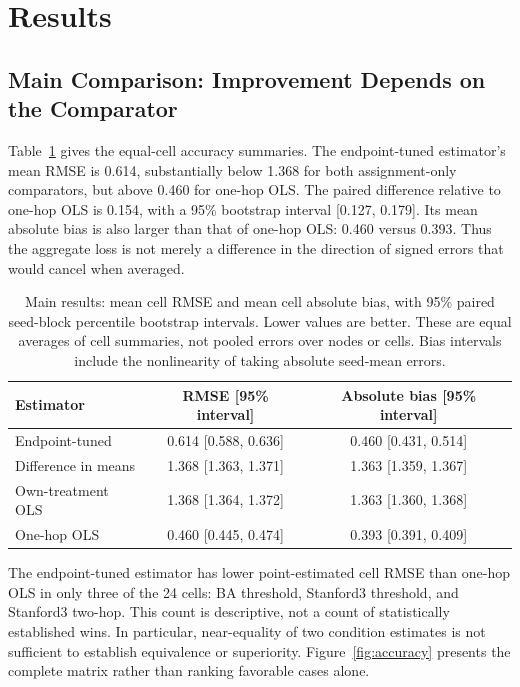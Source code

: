 \documentclass{article}
\begin{document}
\section{Results}
\subsection{Main Comparison: Improvement Depends on the Comparator}
Table~\ref{tab:main} gives the equal-cell accuracy summaries. The endpoint-tuned estimator's mean RMSE is 0.614, substantially below 1.368 for both assignment-only comparators, but above 0.460 for one-hop OLS. The paired difference relative to one-hop OLS is 0.154, with a 95\% bootstrap interval [0.127, 0.179]. Its mean absolute bias is also larger than that of one-hop OLS: 0.460 versus 0.393. Thus the aggregate loss is not merely a difference in the direction of signed errors that would cancel when averaged.

\begin{table}[t]
\centering
\caption{Main results: mean cell RMSE and mean cell absolute bias, with 95\% paired seed-block percentile bootstrap intervals. Lower values are better. These are equal averages of cell summaries, not pooled errors over nodes or cells. Bias intervals include the nonlinearity of taking absolute seed-mean errors.}
\label{tab:main}
\begin{tabular}{lcc}
\toprule
Estimator & RMSE [95\% interval] & Absolute bias [95\% interval]\\
\midrule
Endpoint-tuned & 0.614 [0.588, 0.636] & 0.460 [0.431, 0.514]\\
Difference in means & 1.368 [1.363, 1.371] & 1.363 [1.359, 1.367]\\
Own-treatment OLS & 1.368 [1.364, 1.372] & 1.363 [1.360, 1.368]\\
One-hop OLS & 0.460 [0.445, 0.474] & 0.393 [0.391, 0.409]\\
\bottomrule
\end{tabular}
\end{table}

The endpoint-tuned estimator has lower point-estimated cell RMSE than one-hop OLS in only three of the 24 cells: BA threshold, Stanford3 threshold, and Stanford3 two-hop. This count is descriptive, not a count of statistically established wins. In particular, near-equality of two condition estimates is not sufficient to establish equivalence or superiority. Figure~\ref{fig:accuracy} presents the complete matrix rather than ranking favorable cases alone.
\end{document}
